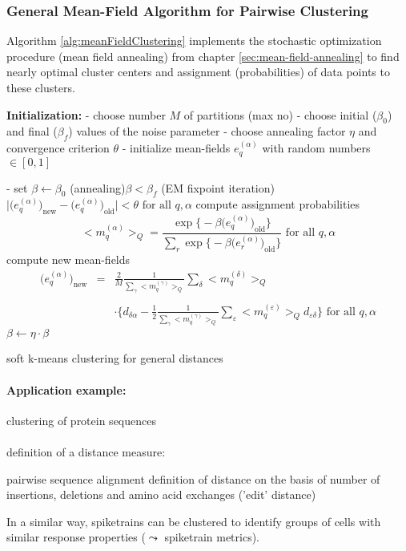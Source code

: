
\subsubsection{General Mean-Field Algorithm for Pairwise Clustering}
\label{sec:generalPairwiseClustering}
Algorithm \ref{alg:meanFieldClustering} implements the stochastic
optimization procedure (mean field annealing) from chapter
\ref{sec:mean-field-annealing} to find nearly optimal cluster centers
and assignment (probabilities) of data points to these clusters.
\begin{algorithm}
  \DontPrintSemicolon
  \textbf{Initialization:}\;
  - choose number $M$ of partitions (max no)\;
  - choose initial  ($\beta_0$) and final  ($\beta_f$) values of the noise parameter\;
  - choose annealing factor  $\eta$ and convergence criterion  $\theta$\;
  - initialize mean-fields  $e_q^{(\alpha)}$ with random numbers $\in [0, 1]$\;

- set $\beta \leftarrow \beta_0$\;
\While(annealing){$\beta < \beta_f$}{
\Repeat(EM fixpoint iteration){
$\big| \big( e_q^{(\alpha)} \big)_{\mathrm{new}}
	- \big( e_q^{(\alpha)} \big)_{\mathrm{old}} \big| < \theta 
	\text{ for all }q, \alpha$}{
compute assignment probabilities\;
\[ \big< m_q^{(\alpha)} \big>_Q = \frac{ \exp \big\{ -\beta \big(e_q^{(\alpha)}
	\big)_{\mathrm{old}}\big\} }{ \sum\limits_r \exp \big\{ -\beta \big(
	e_r^{(\alpha)} \big)_{\mathrm{old}} \big\} } \text{ for all }
	q, \alpha
\]
compute new mean-fields\;
\[ \begin{array}{lll}
   \big( e_q^{(\alpha)} \big)_{\mathrm{new}} 
   	& = & \frac{2}{M} \frac{1}{
	\sum\limits_{\gamma} \big< m_q^{(\gamma)} \big>_Q } \sum\limits_{\delta}
	\big<m_q^{(\delta)} \big>_Q \\\\
	&& \cdot \bigg\{ d_{\delta \alpha} - \frac{1}{2} \frac{1}{
		\sum\limits_{\gamma} \big< m_q^{(\gamma)} \big>_Q }
		\sum\limits_{\varepsilon} \big< m_q^{(\varepsilon)}
		\big>_Q d_{\varepsilon \delta} \bigg\}
	\text{ for all } q, \alpha
   \end{array}
\]
}
$\beta \leftarrow \eta \cdot \beta$\;
}
\label{alg:meanFieldClustering}
\caption{soft k-means clustering for general distances}
\end{algorithm}

\paragraph{Application example:} \label{sec:application-example}
clustering of protein sequences
\\\\
definition of a distance measure:
\begin{itemize}
	\itl pairwise sequence alignment 
	\itl definition of distance on the basis of number of insertions, 
		deletions and amino acid exchanges ('edit' distance)
\end{itemize}
In a similar way, spiketrains can be clustered to identify groups of cells with similar response properties ($\leadsto$ spiketrain metrics).\\ 


